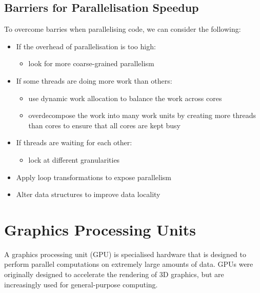 \documentclass{article}
\begin{document}
\subsection{Barriers for Parallelisation Speedup}
To overcome barries when parallelising code, we can consider the
following:
\begin{itemize}
    \item If the overhead of parallelisation is too high:
          \begin{itemize}
              \item look for more coarse-grained parallelism
          \end{itemize}
    \item If some threads are doing more work than others:
          \begin{itemize}
              \item use dynamic work allocation to balance the work
                    across cores
              \item overdecompose the work into many work units by
                    creating more threads than cores to ensure that all
                    cores are kept busy
          \end{itemize}
    \item If threads are waiting for each other:
          \begin{itemize}
              \item lock at different granularities
          \end{itemize}
    \item Apply loop transformations to expose parallelism
    \item Alter data structures to improve data locality
\end{itemize}
\section{Graphics Processing Units}
A graphics processing unit (GPU) is specialised hardware that is
designed to perform parallel computations on extremely large amounts of
data. GPUs were originally designed to accelerate the rendering of 3D
graphics, but are increasingly used for general-purpose computing.
\end{document}
